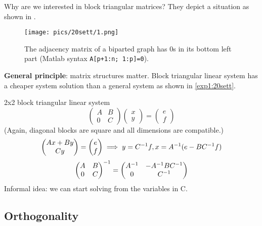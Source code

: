 \documentclass[ComputationalMathematics.tex]{subfiles}
\begin{document}
Why are we interested in block triangular matrices? They depict a situation as shown in .
\begin{figure}[H]
    \centering
    \texttt{[image: pics/20sett/1.png]}
    \caption{The adjacency matrix of a biparted graph has $0$s in its bottom left part (Matlab syntax \texttt{A[p+1:n; 1:p]=0}).}
    \label{fig:20sett3}
\end{figure}

\textbf{General principle}: matrix structures matter. Block triangular linear system has a cheaper system solution than a general system as shown in \cref{exp1:20sett}.
\begin{example}
\label{exp1:20sett}
2x2 block triangular linear system\\
$$
\begin{pmatrix}
    A & B\\
    0 & C
\end{pmatrix}
\begin{pmatrix}
    x \\
    y 
\end{pmatrix} = 
\begin{pmatrix}
    e \\
    f 
\end{pmatrix}
$$
(Again, diagonal blocks are square and all dimensions are
compatible.)
$$
\begin{pmatrix}
    Ax + By\\
    Cy
\end{pmatrix} = 
\begin{pmatrix}
    e \\
    f 
\end{pmatrix}\implies y = {C}^{-1}f, x = {A}^{-1}(e - B{C}^{-1}f)
$$
$$
\begin{pmatrix}
    A & B\\
    0 & C
\end{pmatrix}^{-1} = 
\begin{pmatrix}
          {A}^{-1} & -{A}^{-1}B{C}^{-1}\\
          0 & {C}^{-1}
        \end{pmatrix}
$$
Informal idea: we can start solving from the variables in C.
\end{example}

\subsection{Orthogonality}
\end{document}
